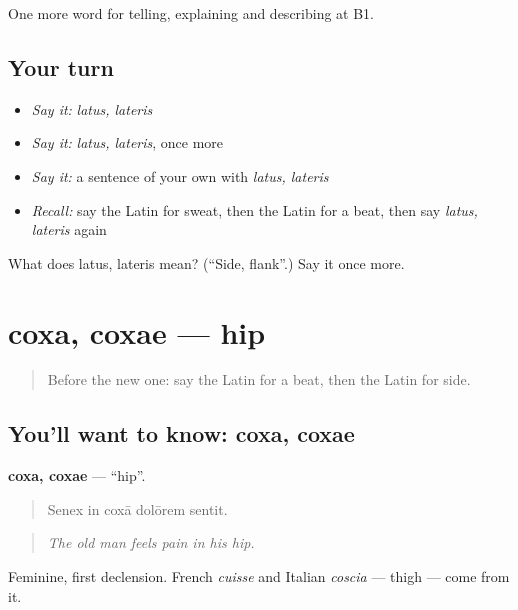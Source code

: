 \begin{grammarlens}[title={What you've built}]
One more word for telling, explaining and describing at B1.
\end{grammarlens}

\subsection*{Your turn}
\begin{itemize}
\raggedright
  \item \emph{Say it:} \emph{latus, lateris}
  \item \emph{Say it:} \emph{latus, lateris}, once more
  \item \emph{Say it:} a sentence of your own with \emph{latus, lateris}
  \item \emph{Recall:} say the Latin for sweat, then the Latin for a beat, then say \emph{latus, lateris} again
\end{itemize}

\begin{tcolorbox}[breakable,colback=teal!4,colframe=teal!35!black,title={Before you move on}]
What does latus, lateris mean? (\textquotedblleft{}Side, flank\textquotedblright{}.) Say it once more.
\end{tcolorbox}
\section[coxa, coxae]{coxa, coxae — hip}

\label{lesson:LA-C518-coxa}



\begin{quote}
Before the new one: say the Latin for a beat, then the Latin for side.
\end{quote}

\subsection*{You'll want to know: coxa, coxae}
\textbf{coxa, coxae} — \textquotedblleft{}hip\textquotedblright{}.

\begin{quote}
Senex in coxā dolōrem sentit.
\end{quote}

\begin{quote}
\emph{The old man feels pain in his hip.}
\end{quote}

Feminine, first declension. French \emph{cuisse} and Italian \emph{coscia} — thigh — come from it.

